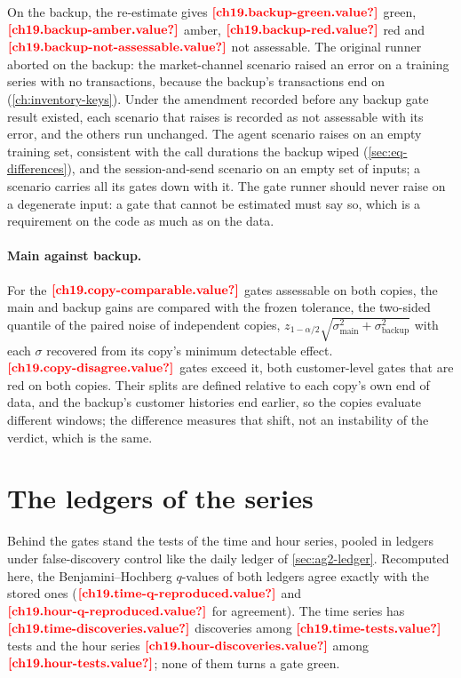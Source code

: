 On the backup, the re-estimate gives $\est{ch19.backup-green}{value}$ green, $\est{ch19.backup-amber}{value}$ amber,
$\est{ch19.backup-red}{value}$ red and $\est{ch19.backup-not-assessable}{value}$ not assessable. The original runner aborted on the
backup: the market-channel scenario raised an error on a training series with no transactions, because the backup's transactions
end on  (\cref{ch:inventory-keys}). Under the amendment recorded before any backup
gate result existed, each scenario that raises is recorded as not assessable with its error, and the others run unchanged. The agent scenario raises on an empty training set, consistent with the call durations the backup wiped (\cref{sec:eq-differences}), and the session-and-send scenario on an empty set of inputs; a scenario carries all its gates down with it. The gate runner should never raise on a degenerate input: a gate that cannot be estimated must say
so, which is a requirement on the code as much as on the data.

\paragraph{Main against backup.} For the $\est{ch19.copy-comparable}{value}$ gates assessable on both copies, the main and backup
gains are compared with the frozen tolerance, the two-sided quantile of the paired noise of independent copies,
$z_{1-\alpha/2} \sqrt{\sigma^2_{\mathrm{main}} + \sigma^2_{\mathrm{backup}}}$ with each $\sigma$ recovered from its copy's minimum
detectable effect. $\est{ch19.copy-disagree}{value}$ gates exceed it, both customer-level gates that are red on both copies. Their
splits are defined relative to each copy's own end of data, and the backup's customer histories end earlier, so the copies evaluate
different windows; the difference measures that shift, not an instability of the verdict, which is the same.

\section{The ledgers of the series}\label{sec:rg-ledgers}

Behind the gates stand the tests of the time and hour series, pooled in ledgers under false-discovery control like the daily ledger
of \cref{sec:ag2-ledger}. Recomputed here, the Benjamini--Hochberg $q$-values of both ledgers agree exactly with the stored ones
($\est{ch19.time-q-reproduced}{value}$ and $\est{ch19.hour-q-reproduced}{value}$ for agreement). The time series has
$\est{ch19.time-discoveries}{value}$ discoveries among $\est{ch19.time-tests}{value}$ tests and the hour series
$\est{ch19.hour-discoveries}{value}$ among $\est{ch19.hour-tests}{value}$; none of them turns a gate green.

